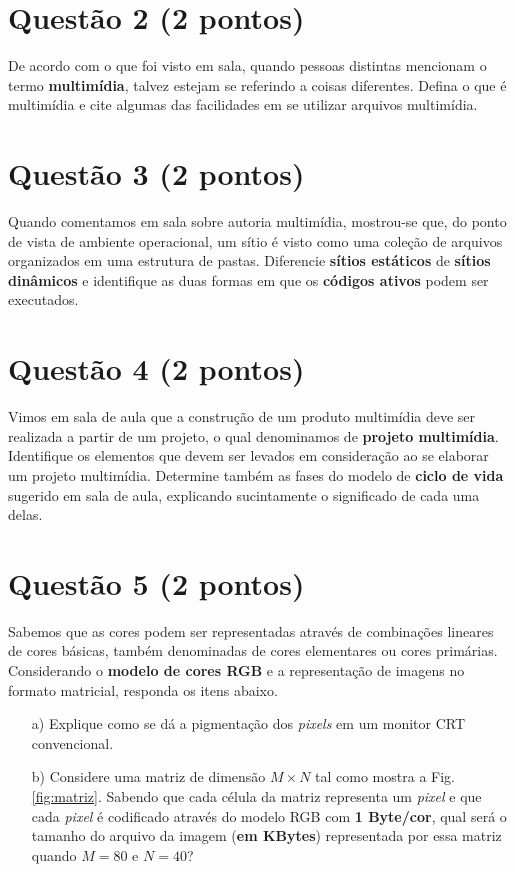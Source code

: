 \documentclass[a4paper,11pt]{article}
\begin{document}
\pagebreak

\section*{Questão 2 (2 pontos)}
De acordo com o que foi visto em sala, quando pessoas distintas mencionam o
termo {\bf multimídia}, talvez estejam se referindo a coisas diferentes.
Defina o que é multimídia e cite algumas das facilidades em se utilizar arquivos
multimídia.

\pagebreak

\section*{Questão 3 (2 pontos)}
Quando comentamos em sala sobre autoria multimídia, mostrou-se que, do ponto de
vista de ambiente operacional, um sítio é visto como uma coleção de arquivos
organizados em uma estrutura de pastas. Diferencie {\bf sítios estáticos} de
{\bf sítios dinâmicos} e identifique as duas formas em que os {\bf códigos
ativos} podem ser executados.
\pagebreak

\section*{Questão 4 (2 pontos)}
Vimos em sala de aula que a construção de um produto multimídia deve ser
realizada a partir de um projeto, o qual denominamos de {\bf projeto
multimídia}. Identifique os elementos que devem ser levados em consideração ao
se elaborar um projeto multimídia. Determine também as fases do modelo de {\bf
ciclo de vida} sugerido em sala de aula, explicando sucintamente o significado
de cada uma delas.
\pagebreak

\section*{Questão 5 (2 pontos)}
Sabemos que as cores podem ser representadas através de combinações lineares de
cores básicas, também denominadas de cores elementares ou cores primárias.
Considerando o {\bf modelo de cores RGB} e a representação de imagens no formato
matricial, responda os itens abaixo.

\begin{itemize}
    \item[a)] Explique como se dá a pigmentação dos {\it pixels} em um monitor
CRT convencional.
    \item[b)] Considere uma matriz de dimensão $M \times N$ tal como mostra a
Fig. \ref{fig:matriz}. Sabendo que cada célula da matriz representa um {\it
pixel} e que cada {\it pixel} é codificado através do modelo RGB com {\bf 1
Byte/cor}, qual será o tamanho do arquivo da imagem ({\bf em KBytes})
representada por essa matriz quando $M = 80$ e $N = 40$?
\end{itemize}
\end{document}
